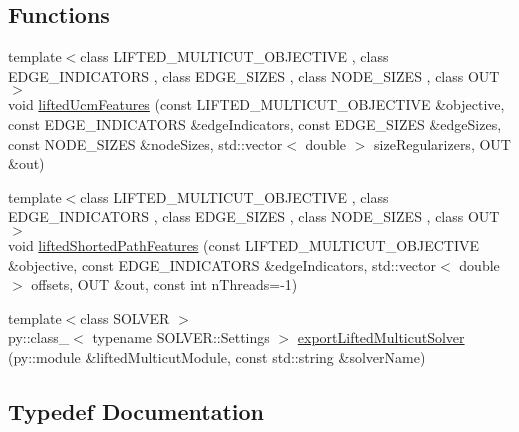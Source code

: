 \subsection*{Functions}
\begin{DoxyCompactItemize}
\item 
{\footnotesize template$<$class L\+I\+F\+T\+E\+D\+\_\+\+M\+U\+L\+T\+I\+C\+U\+T\+\_\+\+O\+B\+J\+E\+C\+T\+I\+V\+E , class E\+D\+G\+E\+\_\+\+I\+N\+D\+I\+C\+A\+T\+O\+R\+S , class E\+D\+G\+E\+\_\+\+S\+I\+Z\+E\+S , class N\+O\+D\+E\+\_\+\+S\+I\+Z\+E\+S , class O\+U\+T $>$ }\\void \hyperlink{namespacenifty_1_1graph_1_1lifted__multicut_aa03838ef8d643b30932610ad7d955327}{lifted\+Ucm\+Features} (const L\+I\+F\+T\+E\+D\+\_\+\+M\+U\+L\+T\+I\+C\+U\+T\+\_\+\+O\+B\+J\+E\+C\+T\+I\+V\+E \&objective, const E\+D\+G\+E\+\_\+\+I\+N\+D\+I\+C\+A\+T\+O\+R\+S \&edge\+Indicators, const E\+D\+G\+E\+\_\+\+S\+I\+Z\+E\+S \&edge\+Sizes, const N\+O\+D\+E\+\_\+\+S\+I\+Z\+E\+S \&node\+Sizes, std\+::vector$<$ double $>$ size\+Regularizers, O\+U\+T \&out)
\item 
{\footnotesize template$<$class L\+I\+F\+T\+E\+D\+\_\+\+M\+U\+L\+T\+I\+C\+U\+T\+\_\+\+O\+B\+J\+E\+C\+T\+I\+V\+E , class E\+D\+G\+E\+\_\+\+I\+N\+D\+I\+C\+A\+T\+O\+R\+S , class E\+D\+G\+E\+\_\+\+S\+I\+Z\+E\+S , class N\+O\+D\+E\+\_\+\+S\+I\+Z\+E\+S , class O\+U\+T $>$ }\\void \hyperlink{namespacenifty_1_1graph_1_1lifted__multicut_a59f3cc129887c91479dde6d6a201d5b3}{lifted\+Shorted\+Path\+Features} (const L\+I\+F\+T\+E\+D\+\_\+\+M\+U\+L\+T\+I\+C\+U\+T\+\_\+\+O\+B\+J\+E\+C\+T\+I\+V\+E \&objective, const E\+D\+G\+E\+\_\+\+I\+N\+D\+I\+C\+A\+T\+O\+R\+S \&edge\+Indicators, std\+::vector$<$ double $>$ offsets, O\+U\+T \&out, const int n\+Threads=-\/1)
\item 
{\footnotesize template$<$class S\+O\+L\+V\+E\+R $>$ }\\py\+::class\+\_\+$<$ typename S\+O\+L\+V\+E\+R\+::\+Settings $>$ \hyperlink{namespacenifty_1_1graph_1_1lifted__multicut_a32c91d0c3068e4f685dd6e0265eef138}{export\+Lifted\+Multicut\+Solver} (py\+::module \&lifted\+Multicut\+Module, const std\+::string \&solver\+Name)
\end{DoxyCompactItemize}


\subsection{Typedef Documentation}
\hypertarget{namespacenifty_1_1graph_1_1lifted__multicut_ae8d3a07757ca6e27f2ea6ffc810c8a75}{}
